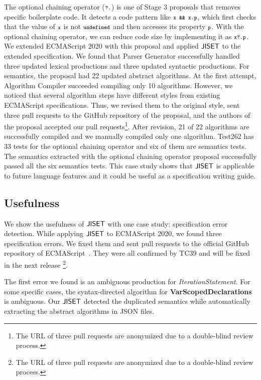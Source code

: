 The optional chaining operator (\( \texttt{\footnotesize?.} \)) is one of Stage 3
proposals that removes specific boilerplate code.  It detects a code
pattern like \( \texttt{\footnotesize x \&\& x.p} \), which first checks that the
value of \( \texttt{\footnotesize x} \) is not \( \texttt{\footnotesize undefined} \) and then
accesses its property \( \texttt{\footnotesize p} \).  With the optional chaining
operator, we can reduce code size by implementing it as \( \texttt{\footnotesize x?.p} \).
We extended ECMAScript 2020 with this proposal and applied \( \text{\sf JISET} \)
to the extended specification.  We found that \textsf{Parser Generator}
successfully handled three updated lexical productions and three
updated syntactic productions.  For semantics, the proposal had 22
updated abstract algorithms.  At the first attempt,
\textsf{Algorithm Compiler} succeeded compiling only 10 algorithms.
However, we noticed that several algorithm steps have different styles
from existing ECMAScript specifications.  Thus, we revised them to the
original style, sent three pull requests to the GitHub repository
of the proposal, and the authors of the proposal accepted our pull
requests\footnote{The URL of three pull requests are anonymized 
due to a double-blind review process.}.  After revision, 21 of 22
algorithms are successfully compiled and we manually compiled only one
algorithm.  Test262 has 33 tests for the optional chaining operator
and six of them are semantics tests.  The semantics extracted with the
optional chaining operator proposal successfully passed all the six
semantics tests.  This case study shows that \( \text{\sf JISET} \) is applicable
to future language features and it could be useful as a specification
writing guide.

\subsection{Usefulness}
We show the usefulness of \( \text{\sf JISET} \) with one case study:
specification error detection.  While applying \( \text{\sf JISET} \) to
ECMAScript 2020, we found three specification errors.  We fixed them
and sent pull requests to the official GitHub repository of
ECMAScript~\cite{es2020}.  They were all confirmed by TC39
and will be fixed in the next release \footnote{The URL of three pull
requests are anonymized due to a double-blind review process.}.

The first error we found is an ambiguous production for
\textit{IterationStatement}.  For some
specific cases, the syntax-directed algorithm for
\textbf{VarScopedDeclarations} is ambiguous.
Our \( \text{\sf JISET} \) detected the duplicated semantics while automatically
extracting the abstract algorithms in JSON files.

